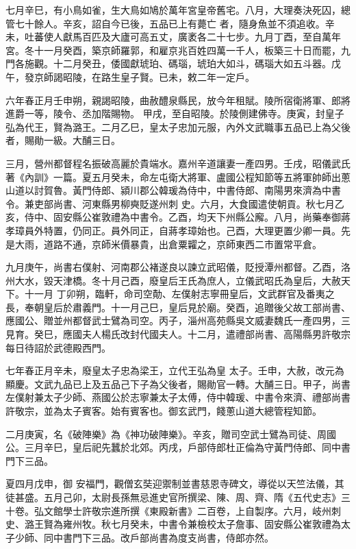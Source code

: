 \begin{pinyinscope}
 七月辛巳，有小鳥如雀，生大鳥如鳩於萬年宮皇帝舊宅。八月，大理奏決死囚，總管七十餘人。辛亥，詔自今已後，五品已上有薨亡
 者，隨身魚並不須追收。辛未，吐蕃使人獻馬百匹及大廬可高五丈，廣袤各二十七步。九月丁酉，至自萬年宮。冬十一月癸酉，築京師羅郭，和雇京兆百姓四萬一千人，板築三十日而罷，九門各施觀。十二月癸丑，倭國獻琥珀、碼瑙，琥珀大如斗，碼瑙大如五斗器。戊午，發京師謁昭陵，在路生皇子賢。已未，敕二年一定戶。



 六年春正月壬申朔，親謁昭陵，曲赦醴泉縣民，放今年租賦。陵所宿衛將軍、郎將進爵一等，陵令、丞加階賜物。
 甲戌，至自昭陵。於陵側建佛寺。庚寅，封皇子弘為代王，賢為潞王。二月乙巳，皇太子忠加元服，內外文武職事五品已上為父後者，賜勛一級。大酺三日。



 三月，營州都督程名振破高麗於貴端水。嘉州辛道讓妻一產四男。壬戌，昭儀武氏著《內訓》一篇。夏五月癸未，命左屯衛大將軍、盧國公程知節等五將軍帥師出蔥山道以討賀魯。黃門侍郎、潁川郡公韓瑗為侍中，中書侍郎、南陽男來濟為中書令。兼吏部尚書、河東縣男柳奭貶遂州刺
 史。六月，大食國遣使朝貢。秋七月乙亥，侍中、固安縣公崔敦禮為中書令。乙酉，均天下州縣公廨。八月，尚藥奉御蔣孝璋員外特置，仍同正。員外同正，自蔣孝璋始也。己酉，大理更置少卿一員。先是大雨，道路不通，京師米價暴貴，出倉粟糶之，京師東西二市置常平倉。



 九月庚午，尚書右僕射、河南郡公褚遂良以諫立武昭儀，貶授潭州都督。乙酉，洛州大水，毀天津橋。冬十月己酉，廢皇后王氏為庶人，立儀武昭氏為皇后，大赦天下。十一月
 丁卯朔，臨軒，命司空勣、左僕射志寧冊皇后，文武群官及番夷之長，奉朝皇后於肅義門。十一月己巳，皇后見於廟。癸酉，追贈後父故工部尚書、應國公、贈並州都督武士鷿為司空。丙子，淄州高苑縣吳文威妻魏氏一產四男，三見育。癸巳，應國夫人楊氏改封代國夫人。十二月，遣禮部尚書、高陽縣男許敬宗每日待詔於武德殿西門。



 七年春正月辛未，廢皇太子忠為梁王，立代王弘為皇
 太子。壬申，大赦，改元為顯慶。文武九品已上及五品己下子為父後者，賜勛官一轉。大酺三日。甲子，尚書左僕射兼太子少師、燕國公於志寧兼太子太傅，侍中韓瑗、中書令來濟、禮部尚書許敬宗，並為太子賓客。始有賓客也。御玄武門，餞蔥山道大總管程知節。



 二月庚寅，名《破陣樂》為《神功破陣樂》。辛亥，贈司空武士鷿為司徒、周國公。三月辛巳，皇后祀先蠶於北郊。丙戌，戶部侍郎杜正倫為守黃門侍郎、同中書門下三品。



 夏四月戊申，御
 安福門，觀僧玄奘迎禦制並書慈恩寺碑文，導從以天竺法儀，其徒甚盛。五月己卯，太尉長孫無忌進史官所撰梁、陳、周、齊、隋《五代史志》三十卷。弘文館學士許敬宗進所撰《東殿新書》二百卷，上自製序。六月，岐州刺史、潞王賢為雍州牧。秋七月癸未，中書令兼檢校太子詹事、固安縣公崔敦禮為太子少師、同中書門下三品。改戶部尚書為度支尚書，侍郎亦然。




\end{pinyinscope}
